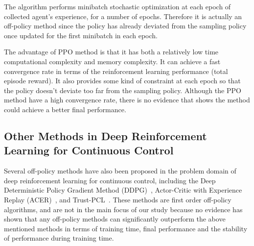 The algorithm performs minibatch stochastic optimization at each epoch of collected agent's experience, for a number of epochs. Therefore it is actually an off-policy method since the policy has already deviated from the sampling policy once updated for the first minibatch in each epoch.

The advantage of PPO method is that it has both a relatively low time computational complexity and memory complexity. It can achieve a fast convergence rate in terms of the reinforcement learning performance (total episode reward). It also provides some kind of constraint at each epoch so that the policy doesn't deviate too far from the sampling policy. Although the PPO method have a high convergence rate, there is no evidence that shows the method could achieve a better final performance.
\subsection{Other Methods in Deep Reinforcement Learning for Continuous Control}
Several off-policy methods have also been proposed in the problem domain of deep reinforcement learning for continuous control, including the Deep Deterministic Policy Gradient Method (DDPG)~\cite{lillicrap2015continuous}, Actor-Critic with Experience Replay (ACER)~\cite{wang2016sample}, and Trust-PCL~\cite{nachum2017trust}. These methods are first order off-policy algorithms, and are not in the main focus of our study because no evidence has shown that any off-policy methods can significantly outperform the above mentioned methods in terms of training time, final performance and the stability of performance during training time.
